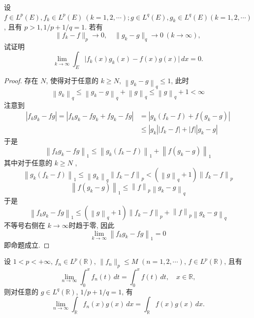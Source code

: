 \documentclass[../main.tex]{subfiles}
\begin{document}
\begin{exercise}{}{}
设 \(f\in L^p(E), f_k\in L^p(E)\ (k=1,2,\cdots); g\in L^q(E), g_k\in L^q(E)(k=1,2,\cdots)\), 且有 \(p>1, 1/p+1/q=1\). 若有
\[
\lVert f_k-f\rVert_p\to 0,\quad \lVert g_k-g\rVert_q\to 0\ (k\to\infty),
\]
试证明
\[
\lim_{k\to\infty}\int_E\lvert f_k(x)g_k(x)-f(x)g(x)\rvert\,dx=0.
\]
\end{exercise}

\begin{proof}
  存在 \(  N  \), 使得对于任意的 \(  k\ge N  \), \(  \left\| g_{k}-g \right\|_{q}\le 1  \), 此时    \[
  \left\| g_{k} \right\|_{q}\le \left\| g_{k}-g \right\|_{q}+ \left\| g \right\|_{q}\le \left\| g \right\|_{q}+ 1< \infty
  \]
  注意到
  \[
  \begin{aligned}
  \left| f_{k}g_{k}-fg \right|= \left| f_{k}g_{k}-fg_{k}+ fg_{k}-fg \right|&= \left| g_{k}\left( f_{k}-f \right)+ f\left( g_{k}-g \right)   \right|  \\ 
   &\le \left| g_{k} \right|\left| f_{k}-f \right|+ \left| f \right|\left| g_{k}-g \right|      
  \end{aligned}
  \]于是 \[
  \left\| f_{k}g_{k}-fg \right\|_{1}\le \left\| g_{k}\left( f_{k}-f \right)  \right\|_{1}+ \left\| f\left( g_{k}-g \right)  \right\|_{1}
  \] 其中对于任意的 \(  k\ge N  \) ,   \[
  \left\| g_{k}\left( f_{k}-f \right)  \right\|_{1}\le \left\| g_{k} \right\|_{q}\left\| f_{k}-f \right\|_{p}< \left( \left\| g \right\|_{q}+ 1 \right) \left\| f_{k}-f \right\|_{p}
  \]\[
  \left\| f\left( g_{k} -g\right)  \right\|_{1}\le \left\| f \right\|_{p}\left\| g_{k}-g \right\|_{q}
  \]于是 \[
  \left\| f_{k}g_{k}-fg \right\|_{1}\le \left( \left\| g \right\|_{q}+ 1 \right)\left\| f_{k}-f \right\|_{p}+ \left\| f \right\|_{p}\left\| g_{k}-g \right\|_{q} 
  \]不等号右侧在 \(  k\to \infty  \)时趋于零, 因此 \[
  \lim_{k\to \infty}\left\| f_{k}g_{k}-fg \right\|_{1}= 0
  \]  即命题成立.
\end{proof}
\begin{exercise}{}{}
设 $1<p<+\infty$, $f_n\in L^p(\mathbb{R})$, $\lVert f_n\rVert_p\leq M$ $(n=1,2,\cdots)$, $f\in L^p(\mathbb{R})$, 且有
\[
\lim_{n\to\infty}\int_0^x f_n(t)\,dt=\int_0^x f(t)\,dt,\quad x\in\mathbb{R},
\]
则对任意的 $g\in L^q(\mathbb{R})$, $1/p+1/q=1$, 有
\[
\lim_{n\to\infty}\int_{\mathbb{R}} f_n(x)g(x)\,dx=\int_{\mathbb{R}} f(x)g(x)\,dx.
\]

\end{exercise}
\end{document}

